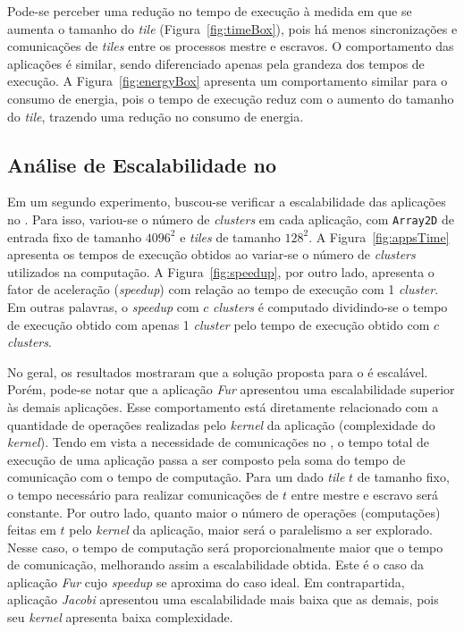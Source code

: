Pode-se perceber uma redução no tempo de execução à medida em que se aumenta o
tamanho do \textit{tile} (Figura~\ref{fig:timeBox}), pois há menos
sincronizações e comunicações de \textit{tiles} entre os processos mestre e
escravos. O comportamento das aplicações é similar, sendo diferenciado apenas
pela grandeza dos tempos de execução.
A Figura~\ref{fig:energyBox} apresenta um comportamento similar para o consumo
de energia, pois o tempo de execução reduz com o aumento do tamanho do
\textit{tile}, trazendo uma redução no consumo de energia.

\subsection{Análise de Escalabilidade no \mppa}

Em um segundo experimento, buscou-se verificar a escalabilidade das aplicações
no \mppa. Para isso, variou-se o número de \textit{clusters} em cada aplicação,
com \texttt{Array2D} de entrada fixo de tamanho $4096^2$ e \textit{tiles} de
tamanho $128^2$. A Figura~\ref{fig:appsTime} apresenta os tempos de execução
obtidos ao variar-se o número de \textit{clusters} utilizados na computação. A
Figura~\ref{fig:speedup}, por outro lado, apresenta o fator de aceleração
(\textit{speedup}) com relação ao tempo de execução com 1 \textit{cluster}. Em
outras palavras, o \textit{speedup} com $c$ \textit{clusters} é computado
dividindo-se o tempo de execução obtido com apenas 1 \textit{cluster} pelo tempo
de execução obtido com $c$ \textit{clusters}.

No geral, os resultados mostraram que a solução proposta para o \mppa é
escalável. Porém, pode-se notar que a aplicação \textit{Fur} apresentou uma
escalabilidade superior às demais aplicações. Esse comportamento está
diretamente relacionado com a quantidade de operações realizadas pelo
\textit{kernel} da aplicação (complexidade do \textit{kernel}). Tendo em vista a
necessidade de comunicações no \mppa, o tempo total de execução de uma aplicação
passa a ser composto pela soma do tempo de comunicação com o tempo de
computação. Para um dado \textit{tile} $t$ de tamanho fixo, o tempo necessário
para realizar comunicações de $t$ entre mestre e escravo será constante. Por
outro lado, quanto maior o número de operações (computações) feitas em $t$ pelo
\textit{kernel} da aplicação, maior será o paralelismo a ser explorado. Nesse
caso, o tempo de computação será proporcionalmente maior que o tempo de
comunicação, melhorando assim a escalabilidade obtida. Este é o caso da
aplicação \textit{Fur} cujo \textit{speedup} se aproxima do caso ideal. Em
contrapartida, aplicação \textit{Jacobi} apresentou uma escalabilidade mais
baixa que as demais, pois seu \textit{kernel} apresenta baixa complexidade.

